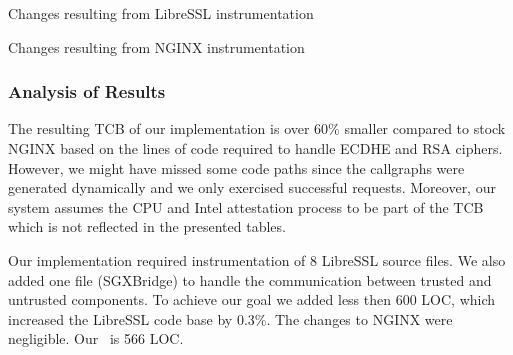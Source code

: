 \documentclass[../../../main.tex]{subfiles}
\begin{document}
\begin{table}[H]
  \caption{Changes resulting from LibreSSL instrumentation}
  \label{tab:libressl-diff}
\end{table}

\begin{table}[H]
  \caption{Changes resulting from NGINX instrumentation}
  \label{tab:nginx-diff}
\end{table}

\subsubsection*{Analysis of Results}
The resulting TCB of our implementation is over 60\% smaller compared to stock
NGINX based on the lines of code required to handle ECDHE and RSA ciphers.
However, we might have missed some code paths since the callgraphs were
generated dynamically and we only exercised successful requests. Moreover, our
system assumes the CPU and Intel attestation process to be part of the TCB
which is not reflected in the presented tables.

Our implementation required instrumentation of 8 LibreSSL source files. We also
added one file (SGXBridge) to handle the communication between trusted and
untrusted components. To achieve our goal we added less then 600 LOC, which
increased the LibreSSL code base by 0.3\%. The changes to NGINX were
negligible. Our \enclaveprogram~is 566 LOC.
\end{document}
